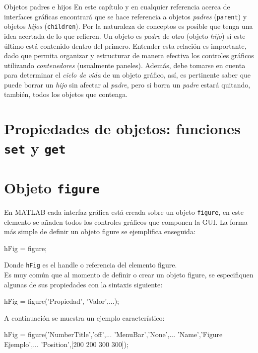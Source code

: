 \begin{informacion}{Objetos padres e hijos}
En este capítulo y en cualquier referencia acerca de
interfaces gráficas encontrará que se hace referencia a
objetos \emph{padres} (\texttt{parent}) y objetos 
\emph{hijos} (\texttt{children}). Por la naturaleza de conceptos es
posible que tenga  una idea acertada de lo que refieren.
Un objeto es \emph{padre} de otro (objeto \emph{hijo}) 
sí este último está contenido dentro del primero. Entender esta relación
es importante,  dado que permita organizar y estructurar
de manera efectiva los controles  gráficos utilizando
\emph{contenedores} (usualmente paneles). Además, debe tomarse
 en cuenta para determinar el \emph{ciclo de vida} de un
objeto gráfico, así, es  pertinente saber que puede
borrar un \emph{hijo} sin afectar al \emph{padre}, pero si borra
 un \emph{padre} estará quitando, también, todos los
objetos que contenga.
\end{informacion}


\section{Propiedades de objetos: funciones \texttt{set} y \texttt{get}}

\section{Objeto \texttt{figure}}

En MATLAB cada interfaz gráfica está creada sobre un objeto
\texttt{figure}, en este elemento se añaden todos los controles gráficos
que componen la GUI. La forma más simple de definir un objeto figure se
ejemplifica enseguida:

\begin{matlab}
hFig = figure;
\end{matlab}

Donde \texttt{hFig} es el handle o referencia del elemento figure.\\

Es muy común que al momento de definir o crear un objeto figure, se
especifiquen algunas de sus propiedades con la sintaxis siguiente:

\begin{matlab}
hFig = figure('Propiedad', 'Valor',...);
\end{matlab}

A continuación se muestra un ejemplo característico:

\begin{matlab}
hFig = figure('NumberTitle','off',...
              'MenuBar','None',...
              'Name','Figure Ejemplo',...
              'Position',[200 200 300 300]);
\end{matlab}

